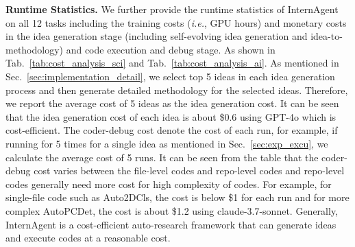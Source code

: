 \textbf{Runtime Statistics.} We further provide the runtime statistics of InternAgent on all 12 tasks including the training costs (\textit{i.e.}, GPU hours) and monetary costs in the idea generation stage (including self-evolving idea generation and idea-to-methodology) and code execution and debug stage. As shown in Tab.~\ref{tab:cost_analysis_sci} and Tab.~\ref{tab:cost_analysis_ai}. As mentioned in Sec.~\ref{sec:implementation_detail}, we select top 5 ideas in each idea generation process and then generate detailed methodology for the selected ideas. Therefore, we report the average cost of 5 ideas as the idea generation cost. It can be seen that the idea generation cost of each idea is about \$0.6 using GPT-4o which is cost-efficient. The coder-debug cost denote the cost of each run, for example, if running for 5 times for a single idea as mentioned in Sec.~\ref{sec:exp_excu}, we calculate the average cost of 5 runs. It can be seen from the table that the coder-debug cost varies between the file-level codes and repo-level codes and repo-level codes generally need more cost for high complexity of codes. For example, for single-file code such as Auto2DCls, the cost is below \$1 for each run and for more complex AutoPCDet, the cost is about \$1.2 using claude-3.7-sonnet. Generally, InternAgent is a cost-efficient auto-research framework that can generate ideas and execute codes at a reasonable cost.



\begin{table}[t]
\centering
\renewcommand{\arraystretch}{1.2}
\caption{Computational and financial cost analysis for all tasks. Training time is measured using A100 GPU hours, while idea generation and code debugging costs are measured in USD using gpt-4o and claude-3.7-sonnet models respectively.}
\vspace{-6pt}
\label{tab:cost_analysis_ai}
\end{table}


